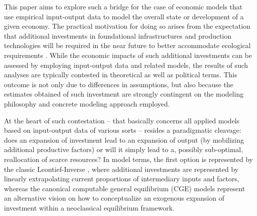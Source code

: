 \documentclass{article}
\begin{document}
This paper aims to explore such a bridge for the case of economic models that use empirical input-output data to model the overall state or development of a given economy. The practical motivation for doing so arises from the expectation that additional investments in foundational infrastructures and production technologies will be required in the near future to better accommodate ecological requirements \citep[e.g.][]{Creutzig.2018,He.2023,Hornykewycz.2025}. While the economic impacts of such additional investments can be assessed by employing input-output data and related models, the results of such analyses are typically contested in theoretical as well as political terms. This outcome is not only due to differences in assumptions, but also because the estimates obtained of such investment are strongly contingent on the modeling philosophy and concrete modeling approach employed. 

At the heart of such contestation -- that basically concerns all applied models based on input-output data of various sorts -- resides a paradigmatic cleavage: does an expansion of investment lead to an expansion of output (by mobilizing additional productive factors) or will it simply lead to a, possibly sub-optimal, reallocation of scarce resources? In model terms, the first option is represented by the classic Leontief-Inverse \citep{Leontief.1936,leontief1986input,BlairMiller}, where additional investments are represented by linearly extrapolating current proportions of intermediary inputs and factors, whereas the canonical computable general equilibrium (CGE) models represent an alternative vision on how to conceptualize an exogenous expansion of investment within a neoclassical equilibrium framework.
\end{document}
